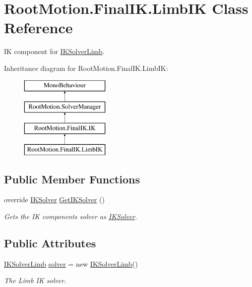 \hypertarget{class_root_motion_1_1_final_i_k_1_1_limb_i_k}{}\section{Root\+Motion.\+Final\+I\+K.\+Limb\+IK Class Reference}
\label{class_root_motion_1_1_final_i_k_1_1_limb_i_k}


IK component for \mbox{\hyperlink{class_root_motion_1_1_final_i_k_1_1_i_k_solver_limb}{I\+K\+Solver\+Limb}}.  


Inheritance diagram for Root\+Motion.\+Final\+I\+K.\+Limb\+IK\+:\begin{figure}[H]
\begin{center}
\leavevmode
\includegraphics[height=4.000000cm]{class_root_motion_1_1_final_i_k_1_1_limb_i_k}
\end{center}
\end{figure}
\subsection*{Public Member Functions}
\begin{DoxyCompactItemize}
\item 
override \mbox{\hyperlink{class_root_motion_1_1_final_i_k_1_1_i_k_solver}{I\+K\+Solver}} \mbox{\hyperlink{class_root_motion_1_1_final_i_k_1_1_limb_i_k_ad5769cba3e3e93e1872e59138e594e2c}{Get\+I\+K\+Solver}} ()
\begin{DoxyCompactList}\small\item\em Gets the IK component\textquotesingle{}s solver as \mbox{\hyperlink{class_root_motion_1_1_final_i_k_1_1_i_k_solver}{I\+K\+Solver}}. \end{DoxyCompactList}\end{DoxyCompactItemize}
\subsection*{Public Attributes}
\begin{DoxyCompactItemize}
\item 
\mbox{\hyperlink{class_root_motion_1_1_final_i_k_1_1_i_k_solver_limb}{I\+K\+Solver\+Limb}} \mbox{\hyperlink{class_root_motion_1_1_final_i_k_1_1_limb_i_k_a6ec986247a8754477daedd78c7b8b70a}{solver}} = new \mbox{\hyperlink{class_root_motion_1_1_final_i_k_1_1_i_k_solver_limb}{I\+K\+Solver\+Limb}}()
\begin{DoxyCompactList}\small\item\em The Limb IK solver. \end{DoxyCompactList}\end{DoxyCompactItemize}
